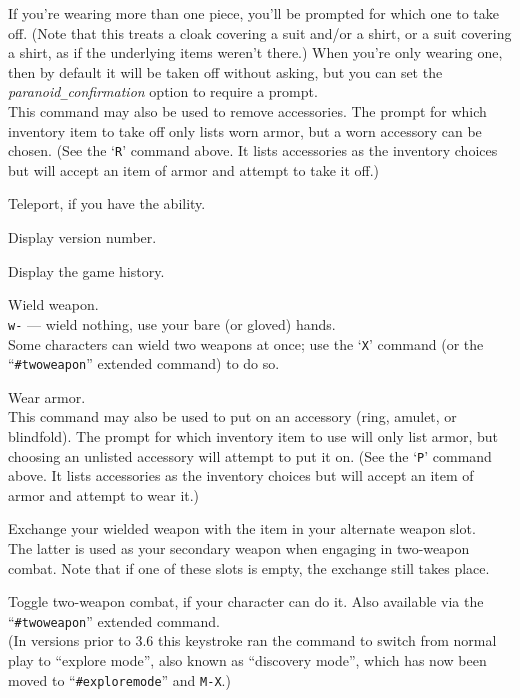 If you're wearing more than one piece, you'll be prompted for which
one to take off.  (Note that this treats a cloak covering a suit
and/or a shirt, or a suit covering a shirt, as if the underlying items
weren't there.)
When you're only wearing one, then by default it will
be taken off without asking, but you can set the
{\it paranoid\verb+_+confirmation\/}
option to require a prompt.\\
This command may also be used to remove accessories.  The prompt
for which inventory item to take off only lists worn armor, but a worn
accessory can be chosen.
(See the `{\tt R}' command above.  It lists accessories as the inventory
choices but will accept an item of armor and attempt to take it off.)
\item[\tb{\^{}T}]
Teleport, if you have the ability.
\item[\tb{v}]
Display version number.
\item[\tb{V}]
Display the game history.
\item[\tb{w}]
Wield weapon.\\
{\tt w-} --- wield nothing, use your bare (or gloved) hands.\\
Some characters can wield two weapons at once; use the `{\tt X}' command
(or the ``{\tt \#twoweapon}'' extended command) to do so.
\item[\tb{W}]
Wear armor.\\
This command may also be used to put on an accessory (ring, amulet, or
blindfold).  The prompt for which inventory item to use will only list
armor, but choosing an unlisted accessory will attempt to put it on.
(See the `{\tt P}' command above.  It lists accessories as the inventory
choices but will accept an item of armor and attempt to wear it.)
\item[\tb{x}]
Exchange your wielded weapon with the item in your alternate weapon slot.\\
The latter is used as your secondary weapon when engaging in
two-weapon combat.  Note that if one of these slots is empty,
the exchange still takes place.
\item[\tb{X}]
Toggle two-weapon combat, if your character can do it.  Also available
via the ``{\tt \#twoweapon}'' extended command.\\
(In versions prior to 3.6 this keystroke ran the command to switch from normal
play to ``explore mode'', also known as ``discovery mode'', which has now
been moved to ``{\tt \#exploremode}'' and {\tt M-X}.)
